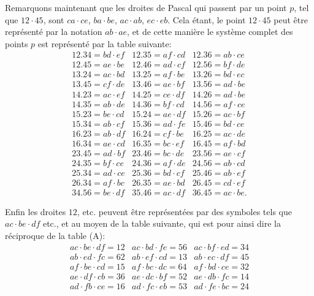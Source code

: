 \documentclass[11pt,a4paper]{book}
\begin{document}
Remarquons maintenant que les droites de Pascal qui passent par un point $p$, tel que $12 \cdot 45$, sont $ca \cdot ce$, $ba \cdot be$, $ac \cdot ab$, $ec \cdot eb$. Cela \'{e}tant, le point $12 \cdot 45$ peut \^{e}tre repr\'{e}sent\'{e} par la notation $ab \cdot ae$, et de cette mani\`{e}re le syst\`{e}me complet des points $p$ est repr\'{e}sent\'{e} par la table suivante:
\begin{equation}\tag{C}
\begin{array}{lll}
12.34 = bd \cdot ef & 12.35 = af \cdot cd & 12.36 = ab \cdot ce \\
12.45 = ae \cdot be & 12.46 = ad \cdot cf & 12.56 = bf \cdot de \\
13.24 = ac \cdot bd & 13.25 = af \cdot be & 13.26 = bd \cdot ec \\
13.45 = cf \cdot de & 13.46 = ae \cdot bf & 13.56 = ad \cdot be \\
14.23 = ac \cdot ef & 14.25 = ce \cdot df & 14.26 = ad \cdot be \\
14.35 = ab \cdot de & 14.36 = bf \cdot cd & 14.56 = af \cdot ce \\
15.23 = be \cdot cd & 15.24 = ae \cdot df & 15.26 = ac \cdot bf \\
15.34 = ab \cdot cf & 15.36 = ad \cdot fe & 15.46 = bd \cdot ce \\
16.23 = ab \cdot df & 16.24 = cf \cdot be & 16.25 = ac \cdot de \\
16.34 = ae \cdot cd & 16.35 = bc \cdot ef & 16.45 = af \cdot bd \\
23.45 = ad \cdot bf & 23.46 = bc \cdot de & 23.56 = ae \cdot cf \\
24.35 = bf \cdot ce & 24.36 = af \cdot de & 24.56 = ab \cdot cd \\
25.34 = ad \cdot ce & 25.36 = bd \cdot cf & 25.46 = ab \cdot ef \\
26.34 = af \cdot bc & 26.35 = ae \cdot bd & 26.45 = cd \cdot ef \\
34.56 = be \cdot df & 35.46 = ac \cdot df & 36.45 = ac \cdot be.
\end{array}
\end{equation}

Enfin les droites $12$, etc. peuvent \^{e}tre repr\'{e}sent\'{e}es par des symboles tels que $ac \cdot be \cdot df$ etc., et au moyen de la table suivante, qui est pour ainsi dire la r\'{e}ciproque de la table (A):
\begin{equation}\tag{D}
\begin{array}{lll}
ac \cdot be \cdot df = 12 & ac \cdot bd \cdot fe = 56 & ac \cdot bf \cdot ed = 34 \\
ab \cdot ed \cdot fc = 62 & ab \cdot ef \cdot cd = 13 & ab \cdot ec \cdot df = 45 \\
af \cdot be \cdot cd = 15 & af \cdot bc \cdot dc = 64 & af \cdot bd \cdot ce = 32 \\
ae \cdot df \cdot cb = 36 & ae \cdot dc \cdot bf = 52 & ae \cdot db \cdot fc = 14 \\
ad \cdot fb \cdot ce = 16 & ad \cdot fc \cdot eb = 53 & ad \cdot fe \cdot bc = 24
\end{array}
\end{equation}
\end{document}
